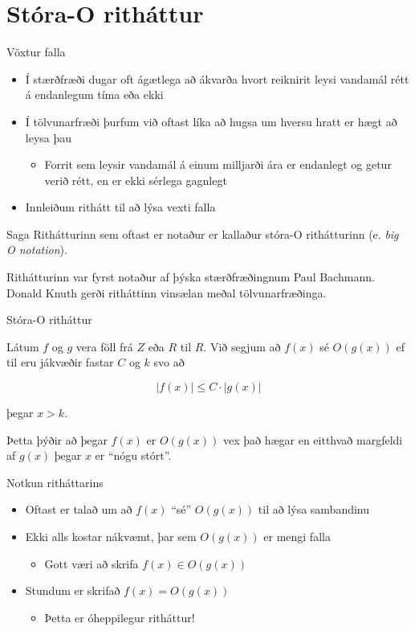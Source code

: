 \documentclass[handout]{beamer}
\begin{document}
\section{Stóra-O ritháttur}

\begin{frame}{Vöxtur falla}
\pause
\begin{itemize}
 \item Í stærðfræði dugar oft ágætlega að ákvarða hvort reiknirit leysi vandamál rétt á endanlegum tíma eða ekki
 \item Í tölvunarfræði þurfum við oftast líka að hugsa um hversu hratt er hægt að leysa þau
 \begin{itemize}
  \item Forrit sem leysir vandamál á einum milljarði ára er endanlegt og getur verið rétt, en er ekki sérlega gagnlegt
 \end{itemize}
 \item Innleiðum rithátt til að lýsa vexti falla
\end{itemize}
\end{frame}

\begin{frame}{Saga}
Rithátturinn sem oftast er notaður er kallaður stóra-O rithátturinn (e. \emph{big O notation}).

Rithátturinn var fyrst notaður af þýska stærðfræðingnum Paul Bachmann. Donald Knuth gerði ritháttinn vinsælan meðal tölvunarfræðinga.
\end{frame}

\begin{frame}{Stóra-O ritháttur}
\begin{tcolorbox}[title=Stóra O ritháttur]
Látum $f$ og $g$ vera föll frá $Z$ eða $R$ til $R$. Við segjum að $f(x)$ sé $O(g(x))$ ef til eru jákvæðir fastar $C$ og $k$ svo að

\[
 |f(x)| \leq C \cdot |g(x)|
\]

þegar $x > k$.
\end{tcolorbox}
Þetta þýðir að þegar $f(x)$ er $O(g(x))$ vex það hægar en eitthvað margfeldi af $g(x)$ þegar $x$ er ``nógu stórt''.
\end{frame}

\begin{frame}{Notkun ritháttarins}
\begin{itemize}
 \item Oftast er talað um að $f(x)$ ``sé'' $O(g(x))$ til að lýsa sambandinu
 \item Ekki alls kostar nákvæmt, þar sem $O(g(x))$ er mengi falla
 \begin{itemize}
  \item Gott væri að skrifa $f(x) \in O(g(x))$
 \end{itemize}
 \item Stundum er skrifað $f(x) = O(g(x))$
 \begin{itemize}
  \item Þetta er óheppilegur ritháttur!
 \end{itemize}
\end{itemize}
\end{frame}
\end{document}
